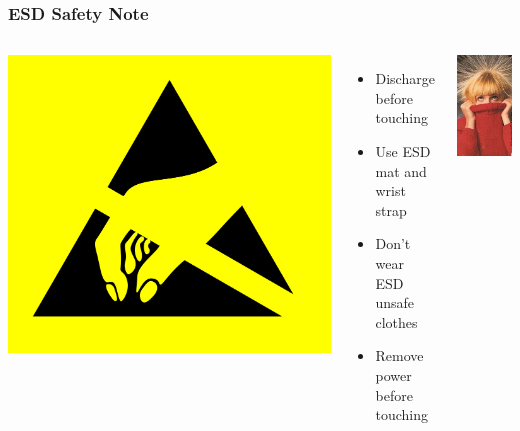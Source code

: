 \begin{frame}
  \frametitle{ESD Safety Note}
  \begin{columns}
      \begin{center}
        \includegraphics[scale=0.05]{images/esd01.png}
      \end{center}
      \begin{itemize}
        \item Discharge before touching
        \item Use ESD mat and wrist strap
        \item Don't wear ESD unsafe clothes
        \item Remove power before touching
      \end{itemize}
      \begin{center}
        \includegraphics[scale=0.55]{images/esd03.jpg}
      \end{center}
  \end{columns}
\end{frame}

